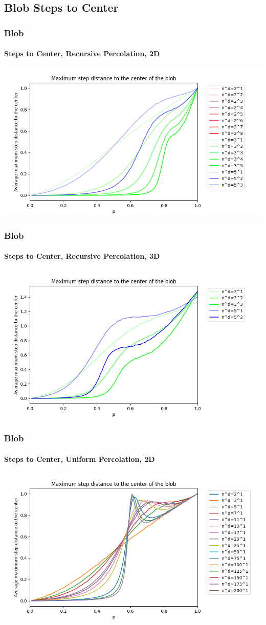 \documentclass{beamer}
\begin{document}
	\subsection{Blob Steps to Center}
	\begin{frame}
		\frametitle{Blob}
		\framesubtitle{Steps to Center, Recursive Percolation, 2D}
		\includegraphics[scale=0.5]{imgs/blob_step_2D.png}
	\end{frame}
	\begin{frame}
		\frametitle{Blob}
		\framesubtitle{Steps to Center, Recursive Percolation, 3D}
		\includegraphics[scale=0.5]{imgs/blob_step_3D.png}
	\end{frame}
	\begin{frame}
		\frametitle{Blob}
		\framesubtitle{Steps to Center, Uniform Percolation, 2D}
		\includegraphics[scale=0.5]{imgs/blob_step_2D_ter.png}
	\end{frame}
\end{document}
